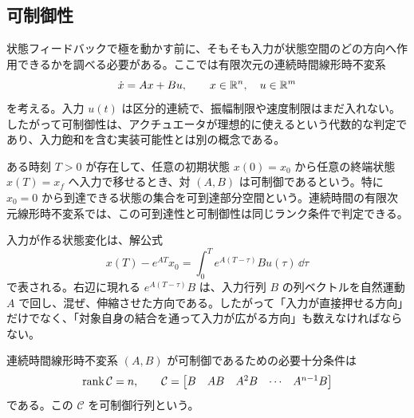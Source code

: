 \subsection{可制御性}

状態フィードバックで極を動かす前に、そもそも入力が状態空間のどの方向へ作用できるかを調べる必要がある。ここでは有限次元の連続時間線形時不変系
\begin{equation}
  \dot{x}=Ax+Bu,\qquad x\in\mathbb{R}^n,\quad u\in\mathbb{R}^m
\end{equation}
を考える。入力 $u(t)$ は区分的連続で、振幅制限や速度制限はまだ入れない。したがって可制御性は、アクチュエータが理想的に使えるという代数的な判定であり、入力飽和を含む実装可能性とは別の概念である。

\begin{definition}[可到達性と可制御性]
ある時刻 $T>0$ が存在して、任意の初期状態 $x(0)=x_0$ から任意の終端状態 $x(T)=x_f$ へ入力で移せるとき、対 $(A,B)$ は可制御であるという。特に $x_0=0$ から到達できる状態の集合を可到達部分空間という。連続時間の有限次元線形時不変系では、この可到達性と可制御性は同じランク条件で判定できる。
\end{definition}

入力が作る状態変化は、解公式
\begin{equation}
  x(T)-e^{AT}x_0
  =\int_0^T e^{A(T-\tau)}Bu(\tau)\,\dd\tau
  \label{eq:reachable-increment}
\end{equation}
で表される。右辺に現れる $e^{A(T-\tau)}B$ は、入力行列 $B$ の列ベクトルを自然運動 $A$ で回し、混ぜ、伸縮させた方向である。したがって「入力が直接押せる方向」だけでなく、「対象自身の結合を通って入力が広がる方向」も数えなければならない。

\begin{theorem}
連続時間線形時不変系 $(A,B)$ が可制御であるための必要十分条件は
\begin{equation}
  \operatorname{rank}\mathcal{C}=n,\qquad
  \mathcal{C}=\begin{bmatrix}B&AB&A^2B&\cdots&A^{n-1}B\end{bmatrix}
  \label{eq:kalman-controllability-matrix}
\end{equation}
である。この $\mathcal{C}$ を可制御行列という。
\end{theorem}

